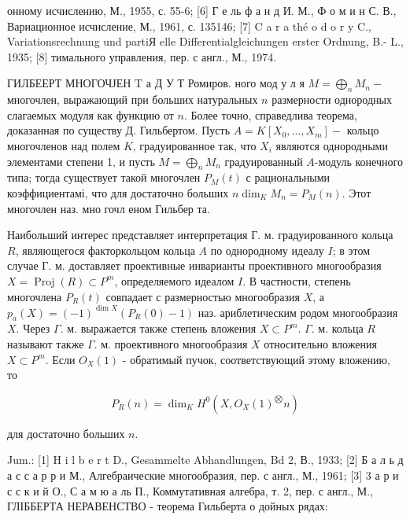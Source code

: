 \documentclass[10pt]{article}
\begin{document}
онному исчислению, М., 1955, с. 55-6; [6] Г е ль ф а н д И. М., Ф о м и н С. В., Вариационное исчисление, М., 1961, с. 135146; [7] C a r a thé o d o r y C., Variationsrechnung und partiЯ elle Differentialgleichungen erster Ordnung, B.- L., 1935; [8] тимального управления, пер. с англ., М., 1974.



ГИЛБЕЕРТ МНОГОЧЈЕН $\mathrm{T}$ а Д У Т Ромиров. ного мод у л я $M=\bigoplus_{n} M_{n}-$ многочлен, выражающий при больших натуральных $n$ размерности однородных слагаемых модуля как функцию от $n$. Более точно, справедлива теорема, доказанная по существу Д. Гильбертом. Пусть $A=K\left[X_{0}, \ldots, X_{m}\right]-$ кольцо многочленов над полем $K$, градуированное так, что $X_{i}$ являются однородными элементами степени 1, и пусть $M=\bigoplus_{n} M_{n}$ градуированный $A$-модуль конечного типа; тогда существует такой многочлен $P_{M}(t)$ с рациональными коэффициентамі, что для достаточно больших $n \operatorname{dim}_{K} M_{n}=P_{M}(n)$. Этот многочлен наз. мно гочл еном Гильбер та.



Наибольший интерес представляет интерпретация Г. м. градуированного кольца $R$, являющегося факторкольцом кольца $A$ по однородному идеалу $I$; в этом случае Г. м. доставляет проективные инварианты проективного многообразия $X=\operatorname{Proj}(R) \subset P^{m}$, определяемого идеалом $I$. В частности, степень многочлена $P_{R}(t)$ совпадает с размерностью многообразия $X$, а $p_{a}(X)=(-1)^{\operatorname{dim} X}\left(P_{R}(0)-1\right)$ наз. ариблетическим родом многообразия $X$. Через $\Gamma$. м. выражается также степень вложения $X \subset P^{m}$. $\Gamma$. м. кольца $R$ называют также $\Gamma$. м. проективного многообразия $X$ относительно вложения $X \subset P^{m}$. Если $O_{X}(1)$ - обратимый пучок, соответствующий этому вложению, то



\[

P_{R}(n)=\operatorname{dim}_{K} H^{0}\left(X, O_{X}(1)^{\bigotimes} n\right)

\]



для достаточно больших $n$.



Jum.: [1] H i l b e r t D., Gesammelte Abhandlungen, Bd 2, В., 1933; [2] Б а л ь д а с с а р р и М., Алгебраические многообразия, пер. с англ., М., 1961; [3] 3 а р и с с к и й О., С а м ю а ль П., Коммутативная алгебра, т. 2, пер. с англ., М., ГЛІББЕРТА НЕРАВЕНСТВО - теорема Гильберта о дойных рядах:
\end{document}
